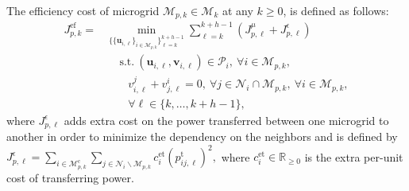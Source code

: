 \begin{defn}
	\label{def:eff_cost}
	The efficiency cost of microgrid $\mathcal{M}_{p,k}\in\bm{\mathcal{M}}_k$ at any $k\geq0$, is defined  as follows:
	\begin{equation*}
	\begin{aligned}
	J_{p,k}^{\mathrm{ef}}=&\min_{\{\{\bm{u}_{i,\ell}\}_{i \in \mathcal{M}_{p,k}}\}_{\ell=k}^{k+h-1}} \sum_{\ell =k}^{k+h-1} \left(J_{p,\ell}^{\mu} + J_{p,\ell}^{{\epsilon}}\right)\\
	& \ \quad \mathrm{s.t.} \
	(\bm{u}_{i,\ell},\bm{v}_{i,\ell}) \in \mathcal{P}_i, \ \forall i \in \mathcal{M}_{p,k}, \\
	& \quad \quad v_{i,\ell}^j + v_{j,\ell}^i = 0, \ \forall j\in\mathcal{N}_i\cap\mathcal{M}_{p,k}, \ \forall i \in \mathcal{M}_{p,k},\\ 
	& \quad \quad \forall\ell \in\{k,\dots, k+h-1 \},
	\end{aligned}
	\end{equation*}
	where $J_{p,\ell}^{{\epsilon}}$ adds extra cost on the power transferred between one microgrid to another in order to minimize the dependency on the neighbors and is defined by
	$J_{p,\ell}^{{\epsilon}} = \sum_{i\in \mathcal{M}_{p,k}^{\mathrm{c}}} \sum_{j \in \mathcal{N}_i\backslash\mathcal{M}_{p,k}} c_{i}^{\mathrm{et}}(p_{ij,\ell}^{\mathrm{t}})^2,$
	where $c_{i}^{\mathrm{et}} \in \mathbb{R}_{\geq 0}$ is the extra per-unit cost of transferring power.\eod
\end{defn}

